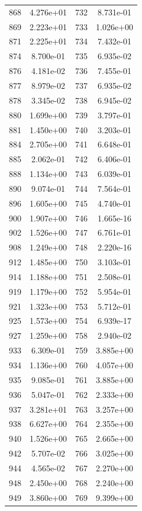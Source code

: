 \documentclass[12pt]{article}
\begin{document}
\begin{longtable}{@{}cccc@{}}
868 & 4.276e+01 & 732 & 8.731e-01 \\
869 & 2.223e+01 & 733 & 1.026e+00 \\
871 & 2.225e+01 & 734 & 7.432e-01 \\
874 & 8.700e-01 & 735 & 6.935e-02 \\
876 & 4.181e-02 & 736 & 7.455e-01 \\
877 & 8.979e-02 & 737 & 6.935e-02 \\
878 & 3.345e-02 & 738 & 6.945e-02 \\
880 & 1.699e+00 & 739 & 3.797e-01 \\
881 & 1.450e+00 & 740 & 3.203e-01 \\
884 & 2.705e+00 & 741 & 6.648e-01 \\
885 & 2.062e-01 & 742 & 6.406e-01 \\
888 & 1.134e+00 & 743 & 6.039e-01 \\
890 & 9.074e-01 & 744 & 7.564e-01 \\
896 & 1.605e+00 & 745 & 4.740e-01 \\
900 & 1.907e+00 & 746 & 1.665e-16 \\
902 & 1.526e+00 & 747 & 6.761e-01 \\
908 & 1.249e+00 & 748 & 2.220e-16 \\
912 & 1.485e+00 & 750 & 3.103e-01 \\
914 & 1.188e+00 & 751 & 2.508e-01 \\
919 & 1.179e+00 & 752 & 5.954e-01 \\
921 & 1.323e+00 & 753 & 5.712e-01 \\
925 & 1.573e+00 & 754 & 6.939e-17 \\
927 & 1.259e+00 & 758 & 2.940e-02 \\
933 & 6.309e-01 & 759 & 3.885e+00 \\
934 & 1.136e+00 & 760 & 4.057e+00 \\
935 & 9.085e-01 & 761 & 3.885e+00 \\
936 & 5.047e-01 & 762 & 2.333e+00 \\
937 & 3.281e+01 & 763 & 3.257e+00 \\
938 & 6.627e+00 & 764 & 2.355e+00 \\
940 & 1.526e+00 & 765 & 2.665e+00 \\
942 & 5.707e-02 & 766 & 3.025e+00 \\
944 & 4.565e-02 & 767 & 2.270e+00 \\
948 & 2.450e+00 & 768 & 2.240e+00 \\
949 & 3.860e+00 & 769 & 9.399e+00 \\

\end{longtable}
\end{document}
